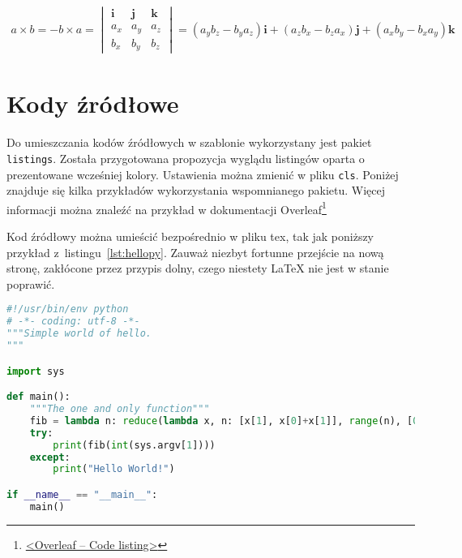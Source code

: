 \begin{gather}
a \times b = -b \times a = 
\begin{vmatrix}
\pmb{i}    &     \pmb{j}      &      \pmb{k}    \\
a_x        &     a_y          &      a_z        \\
b_x        &     b_y          &      b_z        
\end{vmatrix}
= \left(a_y b_z - b_y a_z \right)\pmb{i} 
+ \left(a_z b_x - b_z a_x \right)\pmb{j} 
+ \left(a_x b_y - b_x a_y \right)\pmb{k} 
\end{gather}


\section{Kody źródłowe}
Do umieszczania kodów źródłowych w szablonie wykorzystany jest pakiet \texttt{listings}. Została przygotowana propozycja wyglądu listingów oparta o prezentowane wcześniej kolory. Ustawienia można zmienić w pliku \texttt{cls}. Poniżej znajduje się kilka przykładów wykorzystania wspomnianego pakietu. Więcej informacji można znaleźć na przykład w dokumentacji Overleaf\footnote{\href{https://www.overleaf.com/learn/latex/code_listing}{<Overleaf -- Code listing>}}

Kod źródłowy można umieścić bezpośrednio w pliku tex, tak jak poniższy przykład z~listingu~\ref{lst:hellopy}. Zauważ niezbyt fortunne przejście na nową stronę, zakłócone przez przypis dolny, czego niestety \LaTeX{} nie jest w stanie poprawić.

\begin{lstlisting}[language=Python,
    caption={Prosty program w języku Python},
    label={lst:hellopy}]
#!/usr/bin/env python
# -*- coding: utf-8 -*-
"""Simple world of hello.
"""

import sys

def main():
    """The one and only function"""
    fib = lambda n: reduce(lambda x, n: [x[1], x[0]+x[1]], range(n), [0, 1])[0]
    try:
        print(fib(int(sys.argv[1])))
    except:
        print("Hello World!")

if __name__ == "__main__":
    main()
\end{lstlisting}

